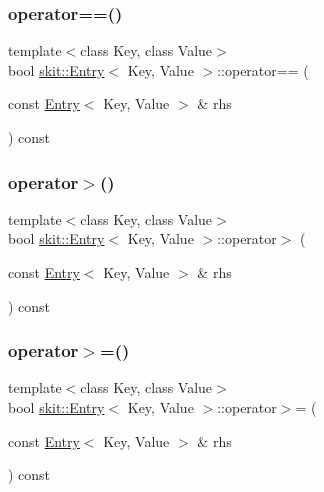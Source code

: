 \mbox{\label{structskit_1_1Entry_ab02041d5c9779acdb50e391f6acc4dd0}} 
\subsubsection{\texorpdfstring{operator==()}{operator==()}}
{\footnotesize\ttfamily template$<$class Key, class Value$>$ \\
bool \hyperlink{structskit_1_1Entry}{skit\+::\+Entry}$<$ Key, Value $>$\+::operator== (\begin{DoxyParamCaption}\item[{const \hyperlink{structskit_1_1Entry}{Entry}$<$ Key, Value $>$ \&}]{rhs }\end{DoxyParamCaption}) const\hspace{0.3cm}{\ttfamily [inline]}}

\mbox{\label{structskit_1_1Entry_a625a98ad3d243386a87c5afa4571c9ca}} 
\subsubsection{\texorpdfstring{operator$>$()}{operator>()}}
{\footnotesize\ttfamily template$<$class Key, class Value$>$ \\
bool \hyperlink{structskit_1_1Entry}{skit\+::\+Entry}$<$ Key, Value $>$\+::operator$>$ (\begin{DoxyParamCaption}\item[{const \hyperlink{structskit_1_1Entry}{Entry}$<$ Key, Value $>$ \&}]{rhs }\end{DoxyParamCaption}) const\hspace{0.3cm}{\ttfamily [inline]}}

\mbox{\label{structskit_1_1Entry_ac376fb663446d1eff4ebe8e08fe9ee06}} 
\subsubsection{\texorpdfstring{operator$>$=()}{operator>=()}}
{\footnotesize\ttfamily template$<$class Key, class Value$>$ \\
bool \hyperlink{structskit_1_1Entry}{skit\+::\+Entry}$<$ Key, Value $>$\+::operator$>$= (\begin{DoxyParamCaption}\item[{const \hyperlink{structskit_1_1Entry}{Entry}$<$ Key, Value $>$ \&}]{rhs }\end{DoxyParamCaption}) const\hspace{0.3cm}{\ttfamily [inline]}}



